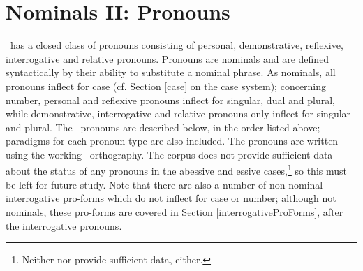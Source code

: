 

\chapter{Nominals II: Pronouns}\label{pronouns}
\PS\ has a closed class of pronouns consisting of personal, demonstrative, reflexive, interrogative and relative pronouns. Pronouns are nominals and are defined syntactically by their ability to substitute a nominal phrase. 
As nominals, all pronouns inflect for case (cf. Section \ref{case} on the case system); concerning number, personal and reflexive pronouns inflect for singular, dual and plural, while demonstrative, interrogative and relative pronouns only inflect for singular and plural. 
The \PS\ pronouns are described below, in the order listed above; paradigms for each pronoun type are also included. The pronouns are written using the working \PS\ orthography. The corpus does not provide sufficient data about the status of any pronouns in the abessive and essive cases,\footnote{Neither \citet{Lagercrantz1926} nor \citet{Lehtiranta1992} provide sufficient data, either.} 
so this must be left for future study. 
Note that there are also a number of non-nominal interrogative pro-forms which do not inflect for case or number; although not nominals, these pro-forms are covered in Section \ref{interrogativeProForms}, after the interrogative pronouns. 


